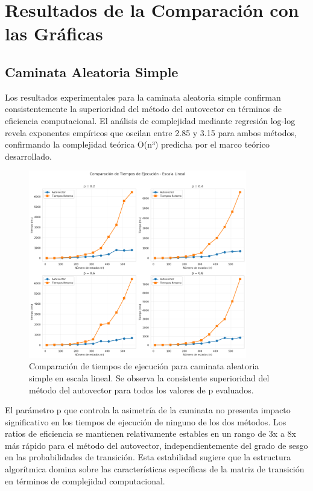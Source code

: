 \section{Resultados de la Comparación con las Gráficas}

\subsection{Caminata Aleatoria Simple}

Los resultados experimentales para la caminata aleatoria simple confirman consistentemente la superioridad del método del autovector en términos de eficiencia computacional. El análisis de complejidad mediante regresión log-log revela exponentes empíricos que oscilan entre 2.85 y 3.15 para ambos métodos, confirmando la complejidad teórica O(n³) predicha por el marco teórico desarrollado.

\begin{figure}[h]
\centering
\includegraphics[width=0.85\textwidth]{../images/caminata_simple_lineal.png}
\caption{Comparación de tiempos de ejecución para caminata aleatoria simple en escala lineal. Se observa la consistente superioridad del método del autovector para todos los valores de p evaluados.}
\label{fig:caminata_simple_lineal}
\end{figure}

El parámetro p que controla la asimetría de la caminata no presenta impacto significativo en los tiempos de ejecución de ninguno de los dos métodos. Los ratios de eficiencia se mantienen relativamente estables en un rango de 3x a 8x más rápido para el método del autovector, independientemente del grado de sesgo en las probabilidades de transición. Esta estabilidad sugiere que la estructura algorítmica domina sobre las características específicas de la matriz de transición en términos de complejidad computacional.

